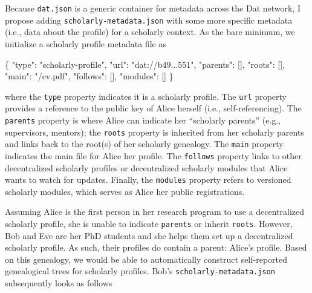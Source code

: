 \documentclass[publications,article,submit,moreauthors,pdftex,10pt,a4paper]{Definitions/mdpi}
\newenvironment{Shaded}{\begin{snugshade}}{\end{snugshade}}
\newcommand{\DataTypeTok}[1]{\textcolor[rgb]{0.13,0.29,0.53}{#1}}
\newcommand{\FunctionTok}[1]{\textcolor[rgb]{0.00,0.00,0.00}{#1}}
\newcommand{\OtherTok}[1]{\textcolor[rgb]{0.56,0.35,0.01}{#1}}
\newcommand{\StringTok}[1]{\textcolor[rgb]{0.31,0.60,0.02}{#1}}
\begin{document}
Because \texttt{dat.json} is a generic container for metadata across the
Dat network, I propose adding \texttt{scholarly-metadata.json} with some
more specific metadata (i.e., data about the profile) for a scholarly
context. As the bare minimum, we initialize a scholarly profile metadata
file as

\begin{Shaded}
\begin{Highlighting}[]
\FunctionTok{\{}
  \DataTypeTok{"type"}\FunctionTok{:} \StringTok{"scholarly-profile"}\FunctionTok{,}
  \DataTypeTok{"url"}\FunctionTok{:} \StringTok{"dat://b49...551"}\FunctionTok{,}
  \DataTypeTok{"parents"}\FunctionTok{:} \OtherTok{[]}\FunctionTok{,}
  \DataTypeTok{"roots"}\FunctionTok{:} \OtherTok{[]}\FunctionTok{,}
  \DataTypeTok{"main"}\FunctionTok{:} \StringTok{"/cv.pdf"}\FunctionTok{,}
  \DataTypeTok{"follows"}\FunctionTok{:} \OtherTok{[]}\FunctionTok{,}
  \DataTypeTok{"modules"}\FunctionTok{:} \OtherTok{[]}
\FunctionTok{\}}
\end{Highlighting}
\end{Shaded}

where the \texttt{type} property indicates it is a scholarly profile.
The \texttt{url} property provides a reference to the public key of
Alice herself (i.e., self-referencing). The \texttt{parents} property is
where Alice can indicate her ``scholarly parents'' (e.g., supervisors,
mentors); the \texttt{roots} property is inherited from her scholarly
parents and links back to the root(s) of her scholarly genealogy. The
\texttt{main} property indicates the main file for Alice her profile.
The \texttt{follows} property links to other decentralized scholarly
profiles or decentralized scholarly modules that Alice wants to watch
for updates. Finally, the \texttt{modules} property refers to versioned
scholarly modules, which serves as Alice her public registrations.

Assuming Alice is the first person in her research program to use a
decentralized scholarly profile, she is unable to indicate
\texttt{parents} or inherit \texttt{roots}. However, Bob and Eve are her
PhD students and she helps them set up a decentralized scholarly
profile. As such, their profiles do contain a parent: Alice's profile.
Based on this genealogy, we would be able to automatically construct
self-reported genealogical trees for scholarly profiles. Bob's
\texttt{scholarly-metadata.json} subsequently looks as follows
\end{document}
